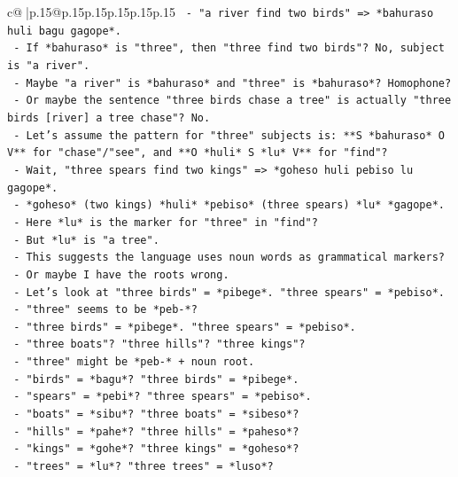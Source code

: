 \documentclass{article}
\begin{document}
{\begin{supertabular}{c@{$\;$}|p{.15\linewidth}@{}p{.15\linewidth}p{.15\linewidth}p{.15\linewidth}p{.15\linewidth}p{.15\linewidth}}
{{{\texttt{        {-}   "a river find two birds" => *bahuraso huli bagu gagope*.} \\
\texttt{        {-}   If *bahuraso* is "three", then "three find two birds"? No, subject is "a river".} \\
\texttt{        {-}   Maybe "a river" is *bahuraso* and "three" is *bahuraso*? Homophone?} \\
\texttt{        {-}   Or maybe the sentence "three birds chase a tree" is actually "three birds {[}river{]} a tree chase"? No.} \\
\texttt{        {-}   Let's assume the pattern for "three" subjects is: **S *bahuraso* O V** for "chase"/"see", and **O *huli* S *lu* V** for "find"?} \\
\texttt{        {-}   Wait, "three spears find two kings" => *goheso huli pebiso lu gagope*.} \\
\texttt{        {-}   *goheso* (two kings) *huli* *pebiso* (three spears) *lu* *gagope*.} \\
\texttt{        {-}   Here *lu* is the marker for "three" in "find"?} \\
\texttt{        {-}   But *lu* is "a tree".} \\
\texttt{        {-}   This suggests the language uses noun words as grammatical markers?} \\
\texttt{        {-}   Or maybe I have the roots wrong.} \\
\texttt{        {-}   Let's look at "three birds" = *pibege*. "three spears" = *pebiso*.} \\
\texttt{        {-}   "three" seems to be *peb{-}*?} \\
\texttt{        {-}   "three birds" = *pibege*. "three spears" = *pebiso*.} \\
\texttt{        {-}   "three boats"? "three hills"? "three kings"?} \\
\texttt{        {-}   "three" might be *peb{-}* + noun root.} \\
\texttt{        {-}   "birds" = *bagu*? "three birds" = *pibege*.} \\
\texttt{        {-}   "spears" = *pebi*? "three spears" = *pebiso*.} \\
\texttt{        {-}   "boats" = *sibu*? "three boats" = *sibeso*?} \\
\texttt{        {-}   "hills" = *pahe*? "three hills" = *paheso*?} \\
\texttt{        {-}   "kings" = *gohe*? "three kings" = *goheso*?} \\
\texttt{        {-}   "trees" = *lu*? "three trees" = *luso*?} \\
}}}
\end{supertabular}}
\end{document}
